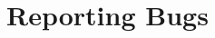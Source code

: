 \documentclass{manual}
\begin{document}




\appendix

\chapter{Reporting Bugs}


%
%

\renewcommand{\indexname}{Module Index}

\renewcommand{\indexname}{Index}
\end{document}
